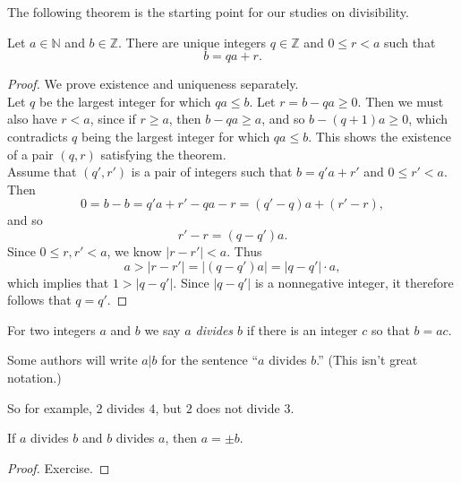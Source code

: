 \documentclass[11pt,dvipsnames]{book}
\numberwithin{equation}{section} %
\numberwithin{figure}{section} %
\numberwithin{table}{section} %
\begin{document}
The following theorem is the starting point for our studies on divisibility. 

\begin{theorem}
Let  $a\in\mathbb{N}$ and $b\in\mathbb{Z}$. There are unique integers $q\in \mathbb{Z}$ and $0\leq r<a$ such that
\[
b=qa+r.
\]
\end{theorem}

\begin{proof}
We prove existence and uniqueness separately. \\

 Let $q$ be the largest integer for which $qa\leq b$. Let $r=b-qa\geq 0$. Then we must also have $r<a$, since if $r\geq a$, then $b-qa\geq a$, and so $b-(q+1)a\geq 0$, which contradicts $q$ being the largest integer for which $qa\leq b$. This shows the existence of a pair $(q,r)$ satisfying the theorem. \\

 Assume that $(q',r')$ is a pair of integers such that $b=q'a+r'$ and $0\leq r'<a$.
Then
\[
0=b-b=q'a+r'-qa-r = (q'-q)a+(r'-r),
\]
and so 
\[
r'-r=(q-q')a.
\]
Since $0\leq r,r'<a$, we know $|r-r'|<a$. Thus
\[
a>|r-r'|=|(q-q')a|=|q-q'|\cdot a,
\]
which implies that $1>|q-q'|$.
Since $|q-q'|$ is a nonnegative integer, it therefore follows that $q=q'$.
\end{proof}

\begin{definition}
For two integers $a$ and $b$ we say {\it $a$ divides $b$} if there is an integer $c$ so that $b=ac$.

Some authors will write $a | b$ for the sentence ``$a$ divides $b$.''
(This isn't great notation.)
\end{definition}

\noindent So for example, $2$ divides $4$, but $2$ does not divide $3$. 


\begin{lemma}
\label{l:abba}
If $a$ divides $b$ and $b$ divides $a$, then $a=\pm b$. 
\end{lemma}

\begin{proof}
Exercise.
\end{proof}

\end{document}

